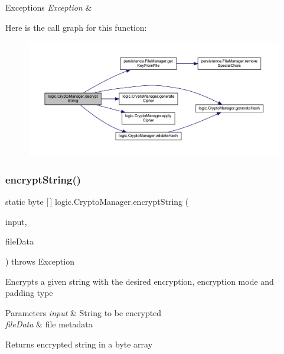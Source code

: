 \begin{DoxyExceptions}{Exceptions}
{\em Exception} & \\
\hline
\end{DoxyExceptions}
Here is the call graph for this function\+:\nopagebreak
\begin{figure}[H]
\begin{center}
\leavevmode
\includegraphics[width=350pt]{classlogic_1_1_crypto_manager_a50efd094cbcfb11a49a74007ddb05155_cgraph}
\end{center}
\end{figure}
\mbox{\label{classlogic_1_1_crypto_manager_a36145e4757e6a380388baddf5e36e984}} 
\subsubsection{\texorpdfstring{encrypt\+String()}{encryptString()}}
{\footnotesize\ttfamily static byte \mbox{[}$\,$\mbox{]} logic.\+Crypto\+Manager.\+encrypt\+String (\begin{DoxyParamCaption}\item[{String}]{input,  }\item[{\mbox{\hyperlink{classpersistence_1_1_meta_data}{Meta\+Data}}}]{file\+Data }\end{DoxyParamCaption}) throws Exception\hspace{0.3cm}{\ttfamily [static]}}

Encrypts a given string with the desired encryption, encryption mode and padding type 
\begin{DoxyParams}{Parameters}
{\em input} & String to be encrypted \\
\hline
{\em file\+Data} & file metadata \\
\hline
\end{DoxyParams}
\begin{DoxyReturn}{Returns}
encrypted string in a byte array 
\end{DoxyReturn}

